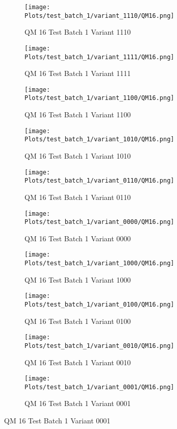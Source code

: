 \documentclass{DissertateFigs}
\begin{document}
\begin{figure}[t!]
    \begin{subfigure}{0.33\textwidth}
    \texttt{[image: Plots/test\_batch\_1/variant\_1110/QM16.png]}
    \caption{QM 16 Test Batch 1 Variant 1110}
    \end{subfigure}
    \begin{subfigure}{0.33\textwidth}
    \texttt{[image: Plots/test\_batch\_1/variant\_1111/QM16.png]}
    \caption{QM 16 Test Batch 1 Variant 1111}
    \end{subfigure}

\medskip

    \begin{subfigure}{0.33\textwidth}
    \texttt{[image: Plots/test\_batch\_1/variant\_1100/QM16.png]}
    \caption{QM 16 Test Batch 1 Variant 1100}
    \end{subfigure}
    \begin{subfigure}{0.33\textwidth}
    \texttt{[image: Plots/test\_batch\_1/variant\_1010/QM16.png]}
    \caption{QM 16 Test Batch 1 Variant 1010}
    \end{subfigure}

\medskip

    \begin{subfigure}{0.33\textwidth}
    \texttt{[image: Plots/test\_batch\_1/variant\_0110/QM16.png]}
    \caption{QM 16 Test Batch 1 Variant 0110}
    \end{subfigure}
    \begin{subfigure}{0.33\textwidth}
    \texttt{[image: Plots/test\_batch\_1/variant\_0000/QM16.png]}
    \caption{QM 16 Test Batch 1 Variant 0000}
    \end{subfigure}

\medskip

    \begin{subfigure}{0.33\textwidth}
    \texttt{[image: Plots/test\_batch\_1/variant\_1000/QM16.png]}
    \caption{QM 16 Test Batch 1 Variant 1000}
    \end{subfigure}
    \begin{subfigure}{0.33\textwidth}
    \texttt{[image: Plots/test\_batch\_1/variant\_0100/QM16.png]}
    \caption{QM 16 Test Batch 1 Variant 0100}
    \end{subfigure}

\medskip

    \begin{subfigure}{0.33\textwidth}
    \texttt{[image: Plots/test\_batch\_1/variant\_0010/QM16.png]}
    \caption{QM 16 Test Batch 1 Variant 0010}
    \end{subfigure}
    \begin{subfigure}{0.33\textwidth}
    \texttt{[image: Plots/test\_batch\_1/variant\_0001/QM16.png]}
    \caption{QM 16 Test Batch 1 Variant 0001}
    \end{subfigure}


\end{figure}
\end{document}
